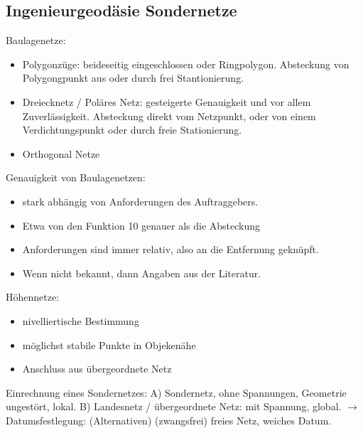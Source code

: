 \documentclass[12pt]{article}
\begin{document}
\subsection{Ingenieurgeodäsie Sondernetze}
Baulagenetze:
\begin{itemize}
\item Polygonzüge: beideseitig eingeschlossen oder Ringpolygon. Absteckung von Polygongpunkt aus oder durch frei Stantionierung.
\item Dreiecknetz / Poläres Netz: gesteigerte Genauigkeit und vor allem Zuverlässigkeit. Absteckung direkt vom Netzpunkt, oder von einem Verdichtungspunkt oder durch freie Stationierung.
\item Orthogonal Netze
\end{itemize}
Genauigkeit von Baulagenetzen:
\begin{itemize}
\item stark abhängig von Anforderungen des Auftraggebers.
\item Etwa von den Funktion 10 genauer als die Absteckung
\item Anforderungen sind immer relativ, also an die Entfernung geknüpft. 
\item Wenn nicht bekannt, dann Angaben aus der Literatur.
\end{itemize}
Höhennetze:
\begin{itemize}
\item nivelliertische Bestimmung
\item möglichst stabile Punkte in Objekenähe
\item Anschluss aus übergeordnete Netz
\end{itemize}
Einrechnung eines Sondernetzes:\newline
A) Sondernetz, ohne Spannungen, Geometrie ungestört, lokal. \newline
B) Landesnetz / übergeordnete Netz: mit Spannung, global. \newline
$\longrightarrow$ Datumsfestlegung: (Alternativen) (zwangsfrei) freies Netz, weiches Datum.
\end{document}
